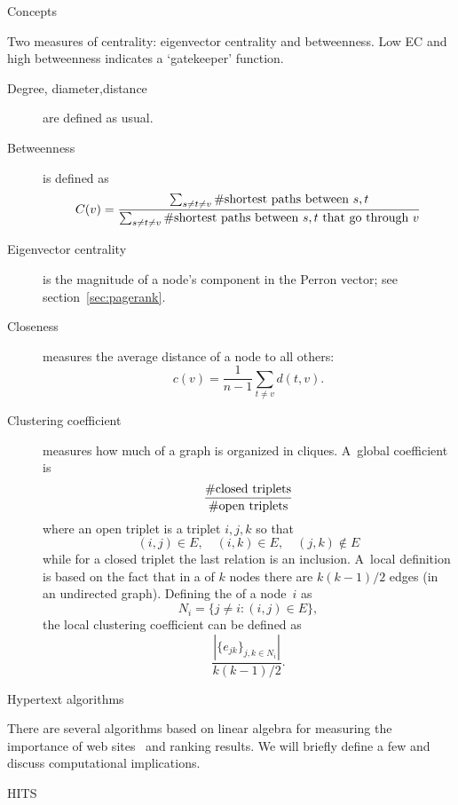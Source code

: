 \begin{notready}
 {Concepts}

Two measures of centrality: eigenvector centrality and
betweenness. Low EC and high betweenness indicates a `gatekeeper'
function.

\begin{description}
  \item[Degree, diameter,distance] are defined as usual.
  \item[Betweenness]%
    is defined as 
    \[ C(v)=\frac
       {\sum_{s\not=t\not=v} \#\hbox{shortest paths between $s,t$}}
       {\sum_{s\not=t\not=v} \#\hbox{shortest paths between $s,t$ that go through $v$}}
    \]
  \item[Eigenvector centrality] is the magnitude of a node's component
    in the Perron vector; see section~\ref{sec:pagerank}.
  \item[Closeness] measures the average distance of a node to all
    others:
    \[ c(v) = \frac{1}{n-1}\sum_{t\not=v}d(t,v). \]
  \item[Clustering coefficient] measures how much of a graph is
    organized in cliques. A~global coefficient is
    \[ \frac{\#\hbox{closed triplets}}{\#\hbox{open triplets}} \]
    where an open triplet is a triplet $i,j,k$ so that
    \[ (i,j)\in E,\quad (i,k)\in E, \quad (j,k)\not\in E \]
    while for a closed triplet the last relation is an
    inclusion. A~local definition is based on the fact that in a
     of $k$ nodes there are $k(k-1)/2$ edges (in an
    undirected graph). Defining the  of a
    node~$i$ as 
    \[ N_i=\{j\not=i\colon (i,j)\in E\}, \]
    the local clustering coefficient can be defined as 
    \[ \frac{|\{e_{jk}\}_{j,k\in N_i}|}{k(k-1)/2}. \]
\end{description}
\end{notready}

 {Hypertext algorithms}
\label{sec:pagerank}

There are several algorithms based on linear algebra
for measuring the importance of web
sites~\cite{Langville2005eigenvector}
and ranking  results.
We will briefly define a few
and discuss computational implications.

 {HITS}

